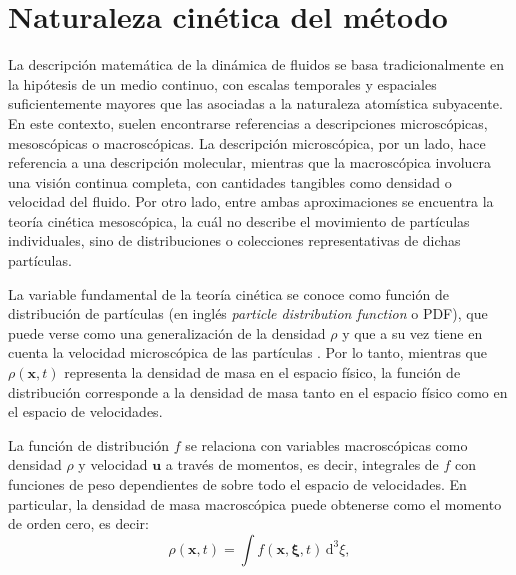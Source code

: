 \section{Naturaleza cin\'etica del m\'etodo}
\label{sec:kinetic}
La descripci\'on matem\'atica de la din\'amica de fluidos se basa tradicionalmente en la hip\'otesis de un medio continuo, con escalas temporales y espaciales suficientemente mayores que las asociadas a la naturaleza atom\'istica subyacente. En este contexto, suelen encontrarse referencias a descripciones microsc\'opicas, mesosc\'opicas o macrosc\'opicas. La descripci\'on microsc\'opica, por un lado, hace referencia a una descripci\'on molecular, mientras que la macrosc\'opica involucra una visi\'on continua completa, con cantidades tangibles como densidad o velocidad del fluido. Por otro lado, entre ambas aproximaciones se encuentra la teor\'ia cin\'etica mesosc\'opica, la cu\'al no describe el movimiento de part\'iculas individuales, sino de distribuciones o colecciones representativas de dichas part\'iculas.
\par
La variable fundamental de la teor\'ia cin\'etica se conoce como funci\'on de distribuci\'on de part\'iculas (en ingl\'es \emph{particle distribution function} o PDF), que puede verse como una generalizaci\'on de la densidad $\rho$ y que a su vez tiene en cuenta la velocidad microsc\'opica de las part\'iculas \bxi{}. Por lo tanto, mientras que $\rho(\bm{x},t)$ representa la densidad de masa en el espacio f\'isico, la funci\'on de distribuci\'on \fvar{} corresponde a la densidad de masa tanto en el espacio f\'isico como en el espacio de velocidades.
\par
La funci\'on de distribuci\'on $f$ se relaciona con variables macrosc\'opicas como densidad $\rho$ y velocidad $\bm{u}$ a trav\'es de momentos, es decir, integrales de $f$ con funciones de peso dependientes de \bxi{} sobre todo el espacio de velocidades. En particular, la densidad de masa macrosc\'opica puede obtenerse como el momento de orden cero, es decir:
\begin{equation}
	\rho(\bm{x},t) = \int f(\bm{x},\bm{\xi},t) \, \mbox{d}^3 \xi,
\end{equation}
